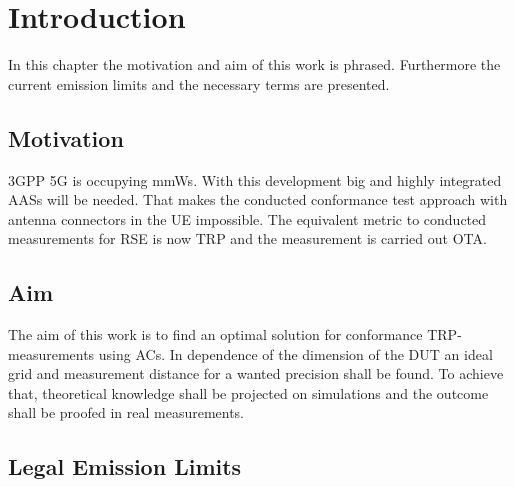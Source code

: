 \chapter{Introduction}

In this chapter the motivation and aim of this work is phrased. Furthermore the current emission limits and the necessary terms are presented.

\section{Motivation}

\ac{3GPP} \ac{5G} is occupying \acp{mmW}. With this development big and highly integrated  \acp{AAS} will be needed. That makes the conducted conformance test approach with antenna connectors in the \ac{UE} impossible. The equivalent metric to conducted measurements for \ac{RSE} is now \ac{TRP} and the measurement is carried out \ac{OTA}.


\section{Aim}

The aim of this work is to find an optimal solution for conformance  \ac{TRP}-measurements using \acp{AC}. In dependence of the dimension of the \ac{DUT} an ideal grid and measurement distance for a wanted precision shall be found. To achieve that, theoretical knowledge shall be projected on simulations and the outcome shall be proofed in real measurements.

\section{Legal Emission Limits}
\label{sec:legem}

